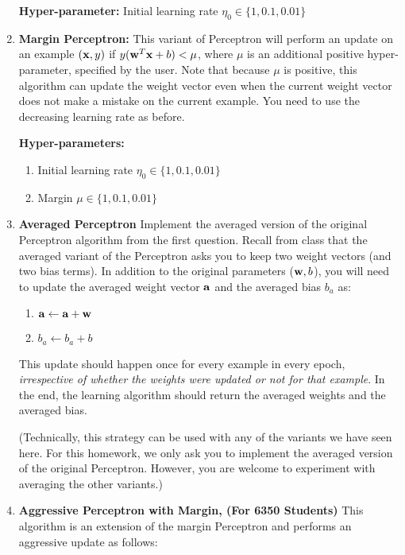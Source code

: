 \begin{enumerate}
  \textbf{Hyper-parameter:} Initial learning rate
  $\eta_0\in \{1,0.1,0.01\}$

\item \textbf{Margin Perceptron:} This variant of Perceptron will
  perform an update on an example $({\bf x}, y)$ if
  $y({\bf w}^T{\bf x} + b) < \mu$, where $\mu$ is an additional positive
  hyper-parameter, specified by the user. Note that because $\mu$ is
  positive, this algorithm can update the weight vector even when the
  current weight vector does not make a mistake on the current
  example.  You need to use the decreasing learning rate as before.

  \textbf{Hyper-parameters:} 
  \begin{enumerate}
  \item Initial learning rate $\eta_0\in \{1,0.1,0.01\}$ 
  \item Margin $\mu\in\{1,0.1,0.01\}$
  \end{enumerate}


\item\textbf{Averaged Perceptron} Implement the averaged version of
  the original Perceptron algorithm from the first question. Recall
  from class that the averaged variant of the Perceptron asks you to
  keep two weight vectors (and two bias terms). In addition to the
  original parameters (${\bf w}, b$), you will need to update the averaged
  weight vector ${\bf a}$ and the averaged bias $b_a$ as:

  \begin{enumerate}
  \item ${\bf a} \leftarrow {\bf a} + {\bf w}$
  \item $b_a \leftarrow b_a + b$
  \end{enumerate}
  
  This update should happen once for every example in every epoch,
  {\em irrespective of whether the weights were updated or not for
    that example}. In the end, the learning algorithm should return
  the averaged weights and the averaged bias.

  (Technically, this strategy can be used with any of the variants we
  have seen here. For this homework, we only ask you to implement the
  averaged version of the original Perceptron. However, you are
  welcome to experiment with averaging the other variants.)

\item {\bf Aggressive Perceptron with Margin, (For 6350 Students)}
  This algorithm is an extension of the margin Perceptron and performs
  an aggressive update as follows:


\end{enumerate}
